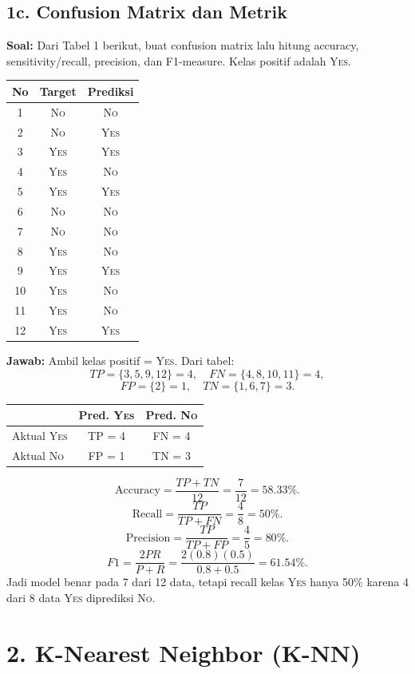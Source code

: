 \documentclass[10pt,a4paper,twocolumn]{article}
\newcommand{\jawab}{\textbf{Jawab: }}
\newcommand{\soal}{\textbf{Soal: }}
\newcommand{\yes}{\textsc{Yes}}
\newcommand{\no}{\textsc{No}}
\begin{document}
\subsection*{1c. Confusion Matrix dan Metrik}
\soal Dari Tabel 1 berikut, buat confusion matrix lalu hitung accuracy, sensitivity/recall, precision, dan F1-measure. Kelas positif adalah \yes.

\begin{center}
\scriptsize
\begin{tabular}{@{}ccc@{}}
\toprule
No & Target & Prediksi \\
\midrule
1 & \no & \no \\
2 & \no & \yes \\
3 & \yes & \yes \\
4 & \yes & \no \\
5 & \yes & \yes \\
6 & \no & \no \\
7 & \no & \no \\
8 & \yes & \no \\
9 & \yes & \yes \\
10 & \yes & \no \\
11 & \yes & \no \\
12 & \yes & \yes \\
\bottomrule
\end{tabular}
\end{center}

\jawab
Ambil kelas positif = \yes. Dari tabel:
\[
TP=\{3,5,9,12\}=4,\quad FN=\{4,8,10,11\}=4,
\]
\[
FP=\{2\}=1,\quad TN=\{1,6,7\}=3.
\]

\begin{center}
\scriptsize
\begin{tabular}{@{}lcc@{}}
\toprule
 & Pred. \yes & Pred. \no \\
\midrule
Aktual \yes & TP = 4 & FN = 4 \\
Aktual \no & FP = 1 & TN = 3 \\
\bottomrule
\end{tabular}
\end{center}

\[
\text{Accuracy}=\frac{TP+TN}{12}=\frac{7}{12}=58.33\%.
\]
\[
\text{Recall}=\frac{TP}{TP+FN}=\frac{4}{8}=50\%.
\]
\[
\text{Precision}=\frac{TP}{TP+FP}=\frac{4}{5}=80\%.
\]
\[
F1=\frac{2PR}{P+R}=\frac{2(0.8)(0.5)}{0.8+0.5}=61.54\%.
\]
Jadi model benar pada 7 dari 12 data, tetapi recall kelas \yes{} hanya 50\% karena 4 dari 8 data \yes{} diprediksi \no.

\section*{2. K-Nearest Neighbor (K-NN)}
\end{document}
